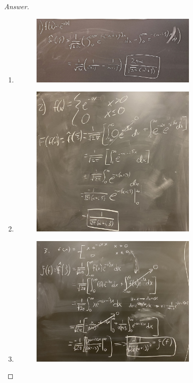 \documentclass{article}
\theoremstyle{definition}
\renewcommand\qedsymbol{$\blacksquare$}
\newenvironment{ans}{\begin{proof}[Answer]\renewcommand{\qedsymbol}{}}{\end{proof}}
\begin{document}
\begin{ans}
    \begin{enumerate}
        \item \phantom{.}
        \begin{figure}[H]
            \centering
            \includegraphics[width = 0.75\textwidth]{Problem 2 Part 1.jpeg}
        \end{figure}

        \item \phantom{.}
        \begin{figure}[H]
            \centering
            \includegraphics[width = 0.75\textwidth]{Problem 2 Part 2.jpeg}
        \end{figure}

        \item \phantom{.}
        \begin{figure}[H]
            \centering
            \includegraphics[width = 0.75\textwidth]{Problem 2 Part 3.jpeg}
        \end{figure}


\end{enumerate}
\end{ans}
\end{document}

